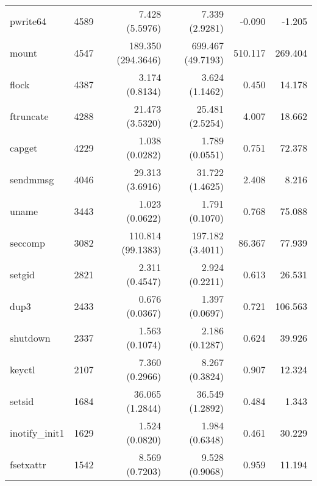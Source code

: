 \begin{longtable}{>{\ttfamily}lrrrrr}
                       pwrite64 &       4589 &              7.428 (5.5976) &            7.339 (2.9281) &          -0.090 &       -1.205 \\
                          mount &       4547 &          189.350 (294.3646) &         699.467 (49.7193) &         510.117 &      269.404 \\
                          flock &       4387 &              3.174 (0.8134) &            3.624 (1.1462) &           0.450 &       14.178 \\
                      ftruncate &       4288 &             21.473 (3.5320) &           25.481 (2.5254) &           4.007 &       18.662 \\
                         capget &       4229 &              1.038 (0.0282) &            1.789 (0.0551) &           0.751 &       72.378 \\
                       sendmmsg &       4046 &             29.313 (3.6916) &           31.722 (1.4625) &           2.408 &        8.216 \\
                          uname &       3443 &              1.023 (0.0622) &            1.791 (0.1070) &           0.768 &       75.088 \\
                        seccomp &       3082 &           110.814 (99.1383) &          197.182 (3.4011) &          86.367 &       77.939 \\
                         setgid &       2821 &              2.311 (0.4547) &            2.924 (0.2211) &           0.613 &       26.531 \\
                           dup3 &       2433 &              0.676 (0.0367) &            1.397 (0.0697) &           0.721 &      106.563 \\
                       shutdown &       2337 &              1.563 (0.1074) &            2.186 (0.1287) &           0.624 &       39.926 \\
                         keyctl &       2107 &              7.360 (0.2966) &            8.267 (0.3824) &           0.907 &       12.324 \\
                         setsid &       1684 &             36.065 (1.2844) &           36.549 (1.2892) &           0.484 &        1.343 \\
                 inotify\_init1 &       1629 &              1.524 (0.0820) &            1.984 (0.6348) &           0.461 &       30.229 \\
                      fsetxattr &       1542 &              8.569 (0.7203) &            9.528 (0.9068) &           0.959 &       11.194 \\

\end{longtable}
